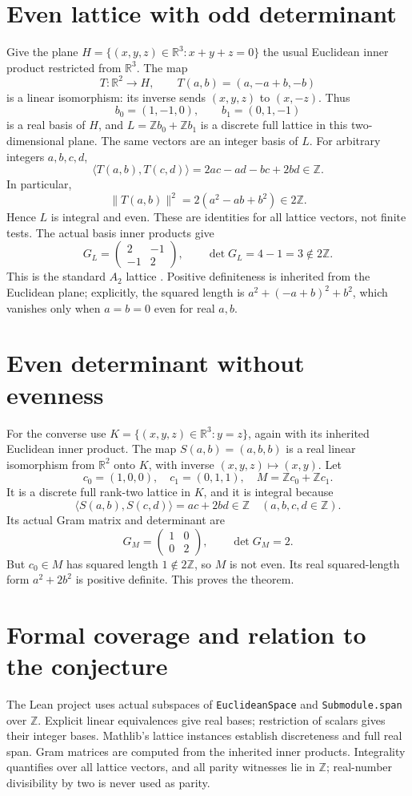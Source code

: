 \documentclass[10pt]{article}
\newcommand{\Z}{\mathbb Z}
\newcommand{\R}{\mathbb R}
\begin{document}
\section{Even lattice with odd determinant}
Give the plane $H=\{(x,y,z)\in\R^3:x+y+z=0\}$ the usual Euclidean inner product restricted from $\R^3$. The map
\[
 T:\R^2\longrightarrow H,\qquad T(a,b)=(a,-a+b,-b)
\]
is a linear isomorphism: its inverse sends $(x,y,z)$ to $(x,-z)$. Thus
\[
 b_0=(1,-1,0),\qquad b_1=(0,1,-1)
\]
is a real basis of $H$, and $L=\Z b_0+\Z b_1$ is a discrete full lattice in this two-dimensional plane. The same vectors are an integer basis of $L$.
For arbitrary integers $a,b,c,d$,
\[
 \langle T(a,b),T(c,d)\rangle=2ac-ad-bc+2bd\in\Z.
\]
In particular,
\[
 \|T(a,b)\|^2=2(a^2-ab+b^2)\in2\Z.
\]
Hence $L$ is integral and even. These are identities for all lattice vectors, not finite tests. The actual basis inner products give
\[
 G_L=\begin{pmatrix}2&-1\\-1&2\end{pmatrix},\qquad
 \det G_L=4-1=3\notin2\Z.
\]
This is the standard $A_2$ lattice \cite{catalogue}. Positive definiteness is inherited from the Euclidean plane; explicitly, the squared length is $a^2+(-a+b)^2+b^2$, which vanishes only when $a=b=0$ even for real $a,b$.

\section{Even determinant without evenness}
For the converse use $K=\{(x,y,z)\in\R^3:y=z\}$, again with its inherited Euclidean inner product. The map $S(a,b)=(a,b,b)$ is a real linear isomorphism from $\R^2$ onto $K$, with inverse $(x,y,z)\mapsto(x,y)$. Let
\[
 c_0=(1,0,0),\quad c_1=(0,1,1),\quad M=\Z c_0+\Z c_1.
\]
It is a discrete full rank-two lattice in $K$, and it is integral because
\[
 \langle S(a,b),S(c,d)\rangle=ac+2bd\in\Z
 \quad(a,b,c,d\in\Z).
\]
Its actual Gram matrix and determinant are
\[
 G_M=\begin{pmatrix}1&0\\0&2\end{pmatrix},\qquad \det G_M=2.
\]
But $c_0\in M$ has squared length $1\notin2\Z$, so $M$ is not even. Its real squared-length form $a^2+2b^2$ is positive definite. This proves the theorem.

\section{Formal coverage and relation to the conjecture}
The Lean project uses actual subspaces of \texttt{EuclideanSpace} and \texttt{Submodule.span} over $\Z$. Explicit linear equivalences give real bases; restriction of scalars gives their integer bases. Mathlib's lattice instances establish discreteness and full real span. Gram matrices are computed from the inherited inner products. Integrality quantifies over all lattice vectors, and all parity witnesses lie in $\Z$; real-number divisibility by two is never used as parity.
\end{document}
